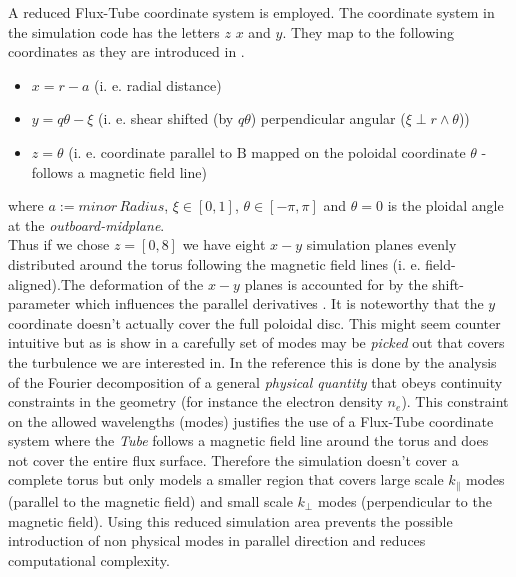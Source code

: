 \documentclass[master.tex]{subfiles}
\begin{document}
A reduced Flux-Tube coordinate system is employed.
The coordinate system in the simulation code has the letters $z$ $x$ and $y$. They map to the following coordinates as they are introduced in \cite{doi:10.1063/1.1335832}.
\begin{itemize}
    \item $x = r - a$   (i. e. radial distance)
    \item $y = q\theta - \xi$ (i. e. shear shifted (by $q\theta$) perpendicular angular ($\xi \perp r \land \theta$))
    \item $z = \theta$ (i. e. coordinate parallel to $\mathrm{B}$ mapped on the poloidal coordinate $\theta$ - follows a magnetic field line)
\end{itemize} 
where $a:=minor\, Radius$, $\xi \in [0,1]$, $\theta \in [-\pi,\pi]$ and $\theta = 0$ is the ploidal angle at the \textit{outboard-midplane}.\\
Thus if we chose $z=[0,8]$ we have eight $x-y$ simulation planes evenly distributed around the torus following the magnetic field lines (i. e. field-aligned).The deformation of the $x-y$ planes is accounted for by the shift-parameter which influences the parallel derivatives \cite{ScootShiftedMetric}.\newline
It is noteworthy that the $y$ coordinate doesn't actually cover the full poloidal disc. This might seem counter intuitive but as is show in \cite{ScottFluxTube} a carefully set of modes may be \textit{picked} out that covers the turbulence we are interested in. In the reference this is done by the analysis of the Fourier decomposition of a general \textit{physical quantity} that obeys continuity constraints in the geometry (for instance the electron density $n_e$).
This constraint on the allowed wavelengths (modes) justifies the use of a Flux-Tube coordinate system where the \textit{Tube} follows a magnetic field line around the torus and does not cover the entire flux surface. Therefore the simulation doesn't cover a complete torus but only models a smaller region that covers large scale $k_\parallel$ modes (parallel to the magnetic field) and small scale $k_\perp$ modes (perpendicular to the magnetic field). Using this reduced simulation area prevents the possible introduction of non physical modes in parallel direction and reduces computational complexity.
\end{document}
